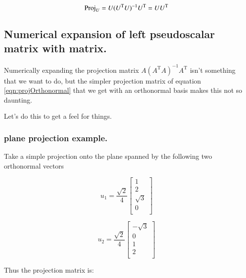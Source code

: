 \documentclass{article}      %
\newcommand{\T}[0]{\text{T}}
\begin{document}
\begin{equation}\label{eqn:projOrthonormal}
\Proj_U = U (U^\T U)^{-1} U^\T = U U^\T
\end{equation}

\subsection{ Numerical expansion of left pseudoscalar matrix with matrix.}

Numerically expanding the projection matrix $A (A^\T A)^{-1}A^\T$ isn't something
that we want to do, but the simpler projection matrix of equation
\ref{eqn:projOrthonormal} that we get with an orthonormal basis makes this not so daunting.

Let's do this to get a feel for things.

\subsubsection{  plane projection example. }

Take a simple projection onto the plane spanned by the following two orthonormal vectors

\[
u_1 = 
\frac{\sqrt{2}}{4}
\begin{bmatrix}
1 \\
2 \\
\sqrt{3} \\
0 \\
\end{bmatrix}
\]

\[
u_2 = 
\frac{\sqrt{2}}{4}
\begin{bmatrix}
-\sqrt{3} \\
0 \\
1 \\
2 \\
\end{bmatrix}
\]

Thus the projection matrix is:
\end{document}
